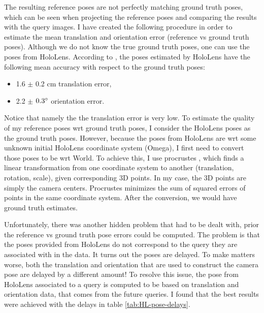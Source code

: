 \documentclass[twoside]{ctuthesis}
\theoremstyle{plain}
\theoremstyle{definition}
\theoremstyle{note}
\begin{document}
\label{paragraph:gt-vs-ref-poses}
The resulting reference poses are not perfectly matching ground truth poses, which can be seen when projecting the reference poses and comparing the results with the query images. I have created the following procedure in order to estimate the mean translation and orientation error (reference vs ground truth poses). Although we do not know the true ground truth poses, one can use the poses from HoloLens. According to \cite{HoloLensEvaluation}, the poses estimated by HoloLens have the following mean accuracy with respect to the ground truth poses:

\begin{itemize}
	\item 1.6 $\pm$ 0.2 cm translation error,
	\item 2.2 $\pm$ $0.3\degree$ orientation error.
\end{itemize}

Notice that namely the the translation error is very low. To estimate the quality of my reference poses wrt ground truth poses, I consider the HoloLens poses as the ground truth poses. However, because the poses from HoloLens are wrt some unknown initial HoloLens coordinate system (Omega), I first need to convert those poses to be wrt World. To achieve this, I use procrustes \cite{procrustes}, which finds a linear transformation from one coordinate system to another (translation, rotation, scale), given corresponding 3D points. In my case, the 3D points are simply the camera centers. Procrustes minimizes the sum of squared errors of points in the same coordinate system. After the conversion, we would have ground truth estimates.

Unfortunately, there was another hidden problem that had to be dealt with, prior the reference vs ground truth pose errors could be computed. The problem is that the poses provided from HoloLens do not correspond to the query they are associated with in the data. It turns out the poses are delayed. To make matters worse, both the translation and orientation that are used to construct the camera pose are delayed by a different amount! To resolve this issue, the pose from HoloLens associated to a query is computed to be based on translation and orientation data, that comes from the future queries. I found that the best results were achieved with the delays in table \ref{tab:HL-pose-delays}.
\end{document}
